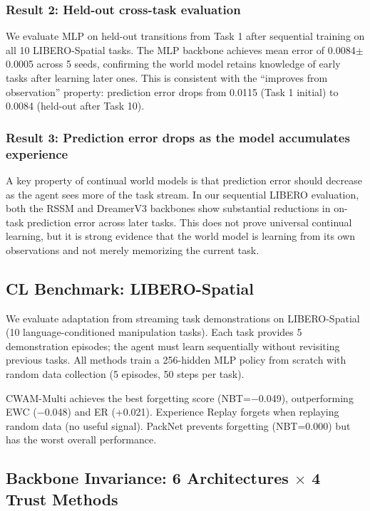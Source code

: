 \documentclass{article}
\begin{document}
\subsubsection{Result 2: Held-out cross-task evaluation}

We evaluate MLP on held-out transitions from Task 1 after sequential training on all 10 LIBERO-Spatial tasks. The MLP backbone achieves mean error of 0.0084$\pm$0.0005 across 5 seeds, confirming the world model retains knowledge of early tasks after learning later ones. This is consistent with the ``improves from observation'' property: prediction error drops from 0.0115 (Task 1 initial) to 0.0084 (held-out after Task 10).

\subsubsection{Result 3: Prediction error drops as the model accumulates experience}

A key property of continual world models is that prediction error should decrease as the agent sees more of the task stream. In our sequential LIBERO evaluation, both the RSSM and DreamerV3 backbones show substantial reductions in on-task prediction error across later tasks. This does not prove universal continual learning, but it is strong evidence that the world model is learning from its own observations and not merely memorizing the current task.

\subsection{CL Benchmark: LIBERO-Spatial}

We evaluate adaptation from streaming task demonstrations on LIBERO-Spatial (10 language-conditioned manipulation tasks). Each task provides 5 demonstration episodes; the agent must learn sequentially without revisiting previous tasks. All methods train a 256-hidden MLP policy from scratch with random data collection (5 episodes, 50 steps per task).

CWAM-Multi achieves the best forgetting score (NBT=$-$0.049), outperforming EWC ($-$0.048) and ER (+0.021). Experience Replay forgets when replaying random data (no useful signal). PackNet prevents forgetting (NBT=0.000) but has the worst overall performance.

\subsection{Backbone Invariance: 6 Architectures $\times$ 4 Trust Methods}
\end{document}
